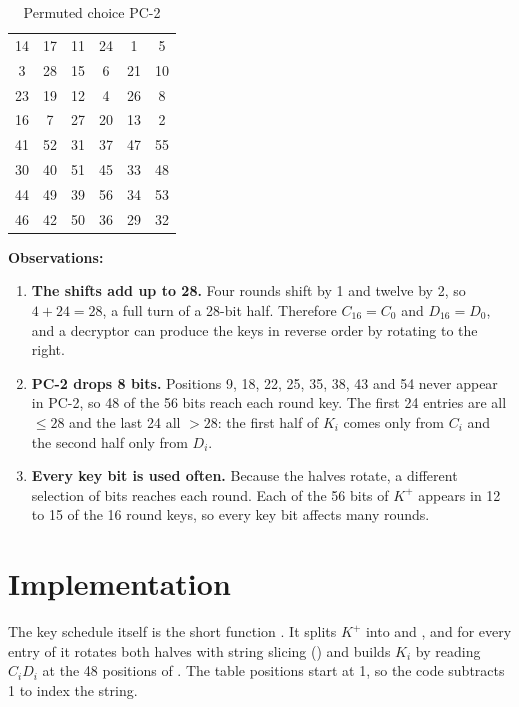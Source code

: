 \documentclass[11pt,a4paper]{article}
\begin{document}
\begin{table}[H]
\centering
\caption{Permuted choice PC-2}\label{tab:pc2}
\small
\begin{tabular}{*{6}{c}}
\toprule
14 & 17 & 11 & 24 & 1 & 5 \\
3 & 28 & 15 & 6 & 21 & 10 \\
23 & 19 & 12 & 4 & 26 & 8 \\
16 & 7 & 27 & 20 & 13 & 2 \\
41 & 52 & 31 & 37 & 47 & 55 \\
30 & 40 & 51 & 45 & 33 & 48 \\
44 & 49 & 39 & 56 & 34 & 53 \\
46 & 42 & 50 & 36 & 29 & 32 \\
\bottomrule
\end{tabular}
\end{table}

\textbf{Observations:}
\begin{enumerate}
  \item \textbf{The shifts add up to 28.} Four rounds shift by 1 and twelve by 2, so
  $4 + 24 = 28$, a full turn of a 28-bit half. Therefore $C_{16} = C_0$ and $D_{16} = D_0$, and a
  decryptor can produce the keys in reverse order by rotating to the right.
  \item \textbf{PC-2 drops 8 bits.} Positions 9, 18, 22, 25, 35, 38, 43 and 54 never appear in
  PC-2, so 48 of the 56 bits reach each round key. The first 24 entries are all $\le 28$ and the
  last 24 all $> 28$: the first half of $K_i$ comes only from $C_i$ and the second half only from
  $D_i$.
  \item \textbf{Every key bit is used often.} Because the halves rotate, a different selection of
  bits reaches each round. Each of the 56 bits of $K^+$ appears in 12 to 15 of the 16 round keys,
  so every key bit affects many rounds.
\end{enumerate}

\section{Implementation}

The key schedule itself is the short function . It splits $K^+$ into
 and , and for every entry of  it rotates both halves with string
slicing () and builds $K_i$ by reading $C_iD_i$ at the 48 positions
of . The table positions start at 1, so the code subtracts 1 to index the string.
\end{document}
